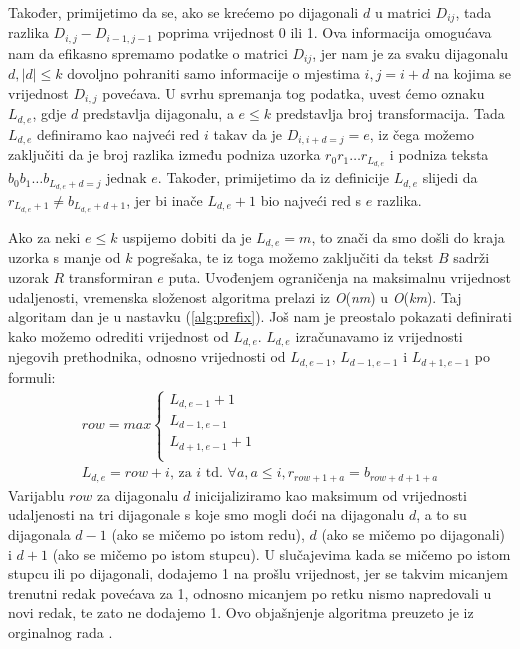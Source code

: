\documentclass[times, utf8, zavrsni]{fer}
\begin{document}
Također, primijetimo da se, ako se krećemo po dijagonali $d$ u matrici $D_{ij}$, tada razlika $D_{i,j} - D_{i-1,j-1}$ poprima vrijednost 0 ili 1. Ova informacija omogućava nam da efikasno spremamo podatke o matrici $D_{ij}$, jer nam je za svaku dijagonalu $d, |d| \leq k$ dovoljno pohraniti samo informacije o mjestima $i,j = i+d$ na kojima se vrijednost $D_{i,j}$ povećava. U svrhu spremanja tog podatka, uvest ćemo oznaku $L_{d,e}$, gdje $d$ predstavlja dijagonalu, a $e \leq k$ predstavlja broj transformacija. Tada $L_{d,e}$ definiramo kao najveći red $i$ takav da je $D_{i,i+d=j} = e$, iz čega možemo zaključiti da je broj razlika između podniza uzorka $r_{0}r_{1}{\dots}r_{L_{d,e}}$ i podniza teksta $b_{0}b_{1}{\dots}b_{L_{d,e}+d=j}$ jednak $e$. Također, primijetimo da iz definicije $L_{d,e}$ slijedi da $r_{L_{d,e}+1}\neq b_{L_{d,e}+d+1}$, jer bi inače $L_{d,e}+1$ bio najveći red s $e$ razlika.

Ako za neki $e \leq k$ uspijemo dobiti da je $L_{d,e} = m$, to znači da smo došli do kraja uzorka s manje od $k$ pogrešaka, te iz toga možemo zaključiti da tekst $B$ sadrži uzorak $R$ transformiran $e$ puta. Uvođenjem ograničenja na maksimalnu vrijednost udaljenosti, vremenska složenost algoritma prelazi iz \textit{O}(\textit{nm}) u \textit{O}(\textit{km}). Taj algoritam dan je u nastavku (\ref{alg:prefix}). Još nam je preostalo pokazati definirati kako možemo odrediti vrijednost od $L_{d,e}$. $L_{d,e}$ izračunavamo iz vrijednosti njegovih prethodnika, odnosno vrijednosti od $L_{d,e-1}$, $L_{d-1,e-1}$ i $L_{d+1,e-1}$ po formuli:
\begin{gather*}
row = max
\begin{cases}
L_{d,e-1} + 1\\
L_{d-1,e-1}\\
L_{d+1,e-1} + 1\\
\end{cases}\\
L_{d,e} = row + i \text{, za } i \text{ td. } \forall a, a\leq i, r_{row+1+a}=b_{row+d+1+a}
\end{gather*}
Varijablu $row$ za dijagonalu $d$ inicijaliziramo kao maksimum od vrijednosti udaljenosti na tri dijagonale s koje smo mogli doći na dijagonalu $d$, a to su dijagonala $d-1$ (ako se mičemo po istom redu), $d$ (ako se mičemo po dijagonali) i $d+1$ (ako se mičemo po istom stupcu). U slučajevima kada se mičemo po istom stupcu ili po dijagonali, dodajemo 1 na prošlu vrijednost, jer se takvim micanjem trenutni redak povećava za 1, odnosno micanjem po retku nismo napredovali u novi redak, te zato ne dodajemo 1. Ovo objašnjenje algoritma preuzeto je iz orginalnog rada \cite{Landau1986}. 
\end{document}
